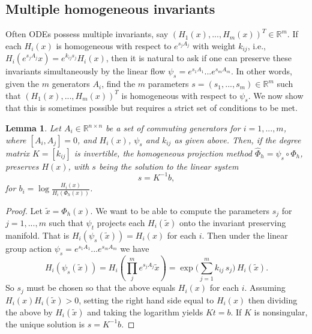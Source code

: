 \documentclass[final,3p,times]{elsarticle}
\newtheorem{lemma}[theorem]{Lemma}
\newcommand{\R}{\mathbb{R}}
\begin{document}
\subsection{Multiple homogeneous invariants}
Often ODEs possess multiple invariants, say $(H_1(x),...,H_m(x))^T\in\R^m$. If each $H_i(x)$ is homogeneous with respect to $e^{s_jA_j}$ with weight $k_{ij}$, i.e., $H_i(e^{s_j A_j} x) = e^{k_{ij} s_j} H_i(x)$, then it is natural to ask if one can preserve these invariants simultaneously by the linear flow $\psi_s = e^{s_1 A_1}...e^{s_m A_m}$. In other words, given the $m$ generators $A_i$, find the $m$ parameters $s = (s_1,...,s_m)\in\R^m$ such that $(H_1(x),...,H_m(x))^T$ is homogeneous with respect to $\psi_s$. We now show that this is sometimes possible but requires a strict set of conditions to be met. 
\begin{lemma}
   Let $A_i\in\R^{n\times n}$ be a set of commuting generators for $i=1,...,m$, where $[A_i,A_j] = 0$, and $H_i(x)$, $\psi_s$ and $k_{ij}$ as given above. Then, if the degree matrix $K=[k_{ij}]$ is invertible, the homogeneous projection method $\widehat{\Phi}_h = \psi_s\circ\Phi_h$, preserves $H(x)$, with $s$ being the solution to the linear system
\begin{equation}\label{eq:Kstar-system}
s = K^{-1}b,
\end{equation}
for $b_i =\log\!\frac{H_i(x)}{H_i(\Phi_h(x))}$.
\end{lemma}
\begin{proof}
Let $\tilde{x}=\Phi_h(x)$. We want to be able to compute the parameters $s_j$ for $j=1,...,m$ such that $\psi_t$ projects each $H_i(\tilde x)$ onto the invariant preserving manifold. That is $H_i(\psi_s(\tilde{x}))=H_i(x)$ for each $i$. Then under the linear group action $\psi_s = e^{s_1 A_1}...e^{s_m A_m}$ we have
\begin{equation}
    H_i(\psi_s(\tilde{x})) = H_i(\prod_{j}^m e^{s_j A_j} \tilde{x}) = \exp\!\Big(\sum_{j=1}^m k_{ij}\,s_j\Big)\,H_i(\tilde{x}).
\end{equation}
So $s_j$ must be chosen so that the above equals $H_i(x)$ for each $i$. Assuming $H_i(x)H_i(\tilde{x})>0$, setting the right hand side equal to $H_i(x)$ then dividing the above by $H_i(\tilde{x})$ and taking the logarithm yields $Kt = b$. If $K$ is nonsingular, the unique solution is $s=K^{-1}b$.
\end{proof}
\end{document}
